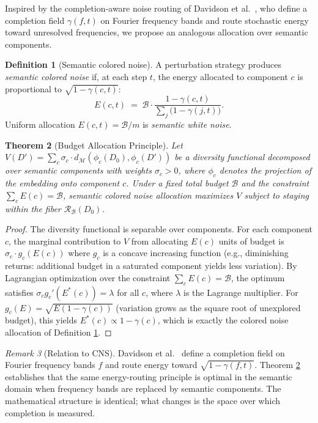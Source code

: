\documentclass[12pt, a4paper]{article}
\theoremstyle{plain}
\newtheorem{theorem}{Theorem}[section]
\theoremstyle{definition}
\newtheorem{definition}[theorem]{Definition}
\theoremstyle{remark}
\newtheorem{remark}[theorem]{Remark}
\newcommand{\calM}{\mathcal{M}}
\newcommand{\calR}{\mathcal{R}}
\newcommand{\dM}{d_{\calM}}
\begin{document}
Inspired by the completion-aware noise routing of Davidson et al.\ 
\cite{davidson2026colorednoisediffusionsampling}, who define a completion field
$\gamma(f, t)$ on Fourier frequency bands and route stochastic energy toward
unresolved frequencies, we propose an analogous allocation over semantic
components.

\begin{definition}[Semantic colored noise]
\label{def:colorednoise}
A perturbation strategy produces \emph{semantic colored noise} if, at each step
$t$, the energy allocated to component $c$ is proportional to
$\sqrt{1 - \gamma(c, t)}$:
\[
   E(c, t) \;=\; \mathcal{B} \cdot
   \frac{1 - \gamma(c, t)}{\displaystyle\sum_j \bigl(1 - \gamma(j, t)\bigr)}.
\]
Uniform allocation $E(c, t) = \mathcal{B}/m$ is \emph{semantic white noise}.
\end{definition}

\begin{theorem}[Budget Allocation Principle]
\label{thm:allocation}
Let $V(D') = \sum_c \sigma_c \cdot \dM(\phi_c(D_0), \phi_c(D'))$ be a
diversity functional decomposed over semantic components with weights
$\sigma_c > 0$, where $\phi_c$ denotes the projection of the embedding onto
component $c$.  Under a fixed total budget $\mathcal{B}$ and the constraint
$\sum_c E(c) = \mathcal{B}$, semantic colored noise allocation maximizes $V$
subject to staying within the fiber $\calR_\mathcal{B}(D_0)$.
\end{theorem}

\begin{proof}
The diversity functional is separable over components.  For each component $c$,
the marginal contribution to $V$ from allocating $E(c)$ units of budget is
$\sigma_c \cdot g_c(E(c))$ where $g_c$ is a concave increasing function (e.g.,
diminishing returns: additional budget in a saturated component yields less
variation).  By Lagrangian optimization over the constraint
$\sum_c E(c) = \mathcal{B}$, the optimum satisfies
$\sigma_c g_c'(E^*(c)) = \lambda$ for all $c$, where $\lambda$ is the Lagrange
multiplier.  For $g_c(E) = \sqrt{E(1 - \gamma(c))}$ (variation grows as the
square root of unexplored budget), this yields
$E^*(c) \propto 1 - \gamma(c)$, which is exactly the colored noise allocation
of Definition \ref{def:colorednoise}.
\end{proof}

\begin{remark}[Relation to CNS]
Davidson et al.\ \cite{davidson2026colorednoisediffusionsampling} define a
completion field on Fourier frequency bands $f$ and route energy toward
$\sqrt{1 - \gamma(f, t)}$.  Theorem \ref{thm:allocation} establishes that the
same energy-routing principle is optimal in the semantic domain when frequency
bands are replaced by semantic components.  The mathematical structure is
identical; what changes is the space over which completion is measured.
\end{remark}
\end{document}
